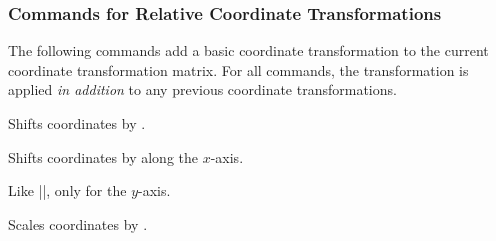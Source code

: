 \subsubsection{Commands for Relative Coordinate Transformations}

The following commands add a basic coordinate transformation to the
current coordinate transformation matrix. For all commands, the
transformation is applied \emph{in addition} to any previous
coordinate transformations.

\begin{command}{\pgftransformshift{}}
  Shifts coordinates by .
\begin{codeexample}[]
\end{codeexample}
\end{command}

\begin{command}{\pgftransformxshift{}}
  Shifts coordinates by  along the $x$-axis.
\begin{codeexample}[]
\end{codeexample}
\end{command}

\begin{command}{\pgftransformyshift{}}
  Like |\pgftransformxshift|, only for the $y$-axis.
\end{command}

\begin{command}{\pgftransformscale{}}
  Scales coordinates by .
\begin{codeexample}[]
\end{codeexample}
\end{command}


